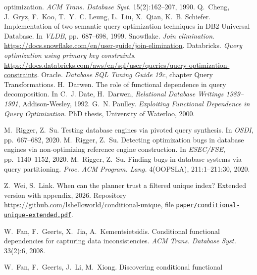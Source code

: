 \documentclass[conference]{IEEEtran}
\theoremstyle{definition}
\newif\ifextended
\begin{document}
\begin{thebibliography}{99}
optimization. \emph{ACM Trans. Database Syst.} 15(2):162--207, 1990.
 Q.~Cheng, J.~Gryz, F.~Koo, T.~Y.~C. Leung, L.~Liu, X.~Qian, K.~B. Schiefer.
  Implementation of two semantic query optimization techniques in DB2 Universal Database. In
  \emph{VLDB}, pp.~687--698, 1999.
 Snowflake. \emph{Join elimination}.
  \url{https://docs.snowflake.com/en/user-guide/join-elimination}.
 Databricks. \emph{Query optimization using primary key constraints}.
  \url{https://docs.databricks.com/aws/en/sql/user/queries/query-optimization-constraints}.
 Oracle. \emph{Database SQL Tuning Guide 19c}, chapter Query
  Transformations.
 H.~Darwen. The role of functional dependence in query decomposition. In
  C.~J. Date, H.~Darwen, \emph{Relational Database Writings 1989--1991}, Addison-Wesley, 1992.
 G.~N. Paulley. \emph{Exploiting Functional Dependence in Query Optimization}.
  PhD thesis, University of Waterloo, 2000.
\ifextended
\bibitem{KLNP22} J.~Kossmann, D.~Lindner, F.~Naumann, T.~Papenbrock. Workload-driven, lazy
  discovery of data dependencies for query optimization. In \emph{CIDR}, 2022.
\fi
{} M.~Rigger, Z.~Su. Testing database engines via pivoted query synthesis. In
  \emph{OSDI}, pp.~667--682, 2020.
 M.~Rigger, Z.~Su. Detecting optimization bugs in database engines via
  non-optimizing reference engine construction. In \emph{ESEC/FSE}, pp.~1140--1152, 2020.
 M.~Rigger, Z.~Su. Finding bugs in database systems via query partitioning.
  \emph{Proc. ACM Program. Lang.} 4(OOPSLA), 211:1--211:30, 2020.
\ifextended\else
{} Z.~Wei, S.~Link. When can the planner trust a filtered unique index? Extended version
  with appendix, 2026. Repository \url{https://github.com/lshelloworld/conditional-unique}, file
  \href{https://github.com/lshelloworld/conditional-unique/blob/main/paper/conditional-unique-extended.pdf}{\nolinkurl{paper/conditional-unique-extended.pdf}}.
\fi
\ifextended
\bibitem{EG95} T.~Eiter, G.~Gottlob. Identifying the minimal transversals of a hypergraph and
  related problems. \emph{SIAM J. Comput.} 24(6):1278--1304, 1995.
\fi
{} W.~Fan, F.~Geerts, X.~Jia, A.~Kementsietsidis. Conditional functional
  dependencies for capturing data inconsistencies. \emph{ACM Trans. Database Syst.}
  33(2):6, 2008.
\ifextended
\bibitem{FK96} M.~L. Fredman, L.~Khachiyan. On the complexity of dualization of monotone
  disjunctive normal forms. \emph{J. Algorithms} 21(3):618--628, 1996.
\fi
{} W.~Fan, F.~Geerts, J.~Li, M.~Xiong. Discovering conditional functional

\end{thebibliography}
\end{document}
